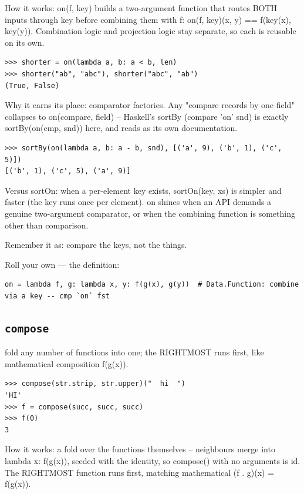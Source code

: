 \documentclass[10pt,letterpaper]{book}
\begin{document}
How it works: on(f, key) builds a two-argument function that routes BOTH inputs through key before combining them with f: on(f, key)(x, y) == f(key(x), key(y)). Combination logic and projection logic stay separate, so each is reusable on its own.

\begin{lstlisting}[style=ex]
>>> shorter = on(lambda a, b: a < b, len)
>>> shorter("ab", "abc"), shorter("abc", "ab")
(True, False)
\end{lstlisting}

Why it earns its place: comparator factories. Any "compare records by one field" collapses to on(compare, field) -- Haskell's sortBy (compare 'on' snd) is exactly sortBy(on(cmp, snd)) here, and reads as its own documentation.

\begin{lstlisting}[style=ex]
>>> sortBy(on(lambda a, b: a - b, snd), [('a', 9), ('b', 1), ('c', 5)])
[('b', 1), ('c', 5), ('a', 9)]
\end{lstlisting}

Versus sortOn: when a per-element key exists, sortOn(key, xs) is simpler and faster (the key runs once per element). on shines when an API demands a genuine two-argument comparator, or when the combining function is something other than comparison.


Remember it as: compare the keys, not the things.


Roll your own --- the definition:

\begin{lstlisting}[style=ex]
on = lambda f, g: lambda x, y: f(g(x), g(y))  # Data.Function: combine via a key -- cmp `on` fst
\end{lstlisting}
\subsection{\texttt{compose}}\label{def:compose}
fold any number of functions into one; the RIGHTMOST runs first, like mathematical composition f(g(x)).
\begin{lstlisting}[style=ex]
>>> compose(str.strip, str.upper)("  hi  ")
'HI'
>>> f = compose(succ, succ, succ)
>>> f(0)
3
\end{lstlisting}

How it works: a fold over the functions themselves -- neighbours merge into lambda x: f(g(x)), seeded with the identity, so compose() with no arguments is id. The RIGHTMOST function runs first, matching mathematical (f . g)(x) = f(g(x)).
\end{document}
